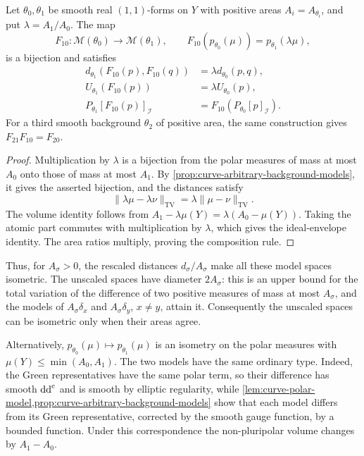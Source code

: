 \begin{theorem}\label{thm:curve-background-homothety}
Let $\theta_0,\theta_1$ be smooth real $(1,1)$-forms on $Y$ with positive areas $A_i=A_{\theta_i}$, and put $\lambda=A_1/A_0$. The map
\[
 F_{10}\colon\mathcal M(\theta_0)\longrightarrow\mathcal M(\theta_1),
 \qquad F_{10}(p_{\theta_0}(\mu))=p_{\theta_1}(\lambda\mu),
\]
is a bijection and satisfies
\begin{equation}\label{eq:curve-background-homothety}
 \begin{split}
 d_{\theta_1}(F_{10}(p),F_{10}(q))&=\lambda d_{\theta_0}(p,q),\\
 U_{\theta_1}(F_{10}(p))&=\lambda U_{\theta_0}(p),\\
 P_{\theta_1}[F_{10}(p)]_{\mathcal I}
 &=F_{10}(P_{\theta_0}[p]_{\mathcal I}).
 \end{split}
\end{equation}
For a third smooth background $\theta_2$ of positive area, the same construction gives $F_{21}F_{10}=F_{20}$.
\end{theorem}
\begin{proof}
Multiplication by $\lambda$ is a bijection from the polar measures of mass at most $A_0$ onto those of mass at most $A_1$. By \cref{prop:curve-arbitrary-background-models}, it gives the asserted bijection, and the distances satisfy
\[
 \|\lambda\mu-\lambda\nu\|_{\mathrm{TV}}
 =\lambda\|\mu-\nu\|_{\mathrm{TV}}.
\]
The volume identity follows from $A_1-\lambda\mu(Y)=\lambda(A_0-\mu(Y))$. Taking the atomic part commutes with multiplication by $\lambda$, which gives the ideal-envelope identity. The area ratios multiply, proving the composition rule.
\end{proof}

Thus, for $A_\sigma>0$, the rescaled distances $d_\sigma/A_\sigma$ make all these model spaces isometric. The unscaled spaces have diameter $2A_\sigma$: this is an upper bound for the total variation of the difference of two positive measures of mass at most $A_\sigma$, and the models of $A_\sigma\delta_x$ and $A_\sigma\delta_y$, $x\ne y$, attain it. Consequently the unscaled spaces can be isometric only when their areas agree.

Alternatively, $p_{\theta_0}(\mu)\mapsto p_{\theta_1}(\mu)$ is an isometry on the polar measures with $\mu(Y)\leq\min(A_0,A_1)$. The two models have the same ordinary type. Indeed, the Green representatives have the same polar term, so their difference has smooth $\mathrm{dd}^{\mathrm{c}}$ and is smooth by elliptic regularity, while \cref{lem:curve-polar-model,prop:curve-arbitrary-background-models} show that each model differs from its Green representative, corrected by the smooth gauge function, by a bounded function. Under this correspondence the non-pluripolar volume changes by $A_1-A_0$.

